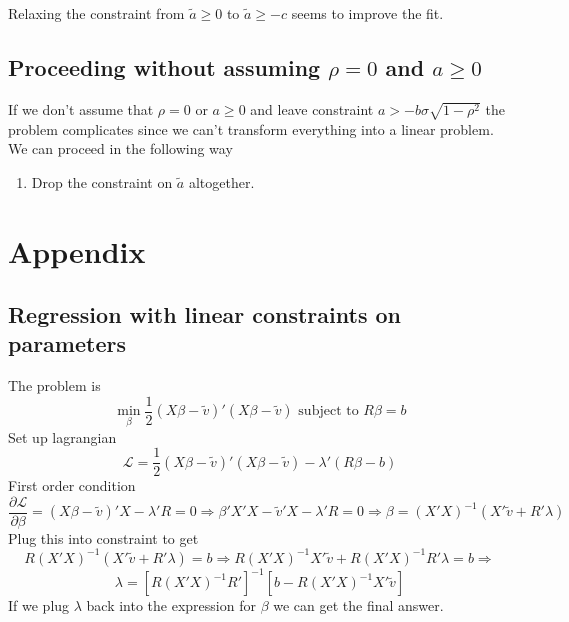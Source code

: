 \documentclass[12pt]{article}
\newcommand{\parder}[2]{\frac{\partial #1}{\partial #2}}
\begin{document}
Relaxing the constraint from $\tilde{a} \ge 0$ to $\tilde{a} \ge -c$ seems to improve the fit.

\subsection{Proceeding without assuming $\rho = 0$ and $a \ge 0$}

If we don't assume that $\rho = 0$ or $a \ge 0$ and leave constraint $a > -b\sigma\sqrt{1-\rho^2}$ the problem complicates since we can't transform everything into a linear problem. We can proceed in the following way

\begin{enumerate}
	\item Drop the constraint on $\tilde{a}$ altogether.
\end{enumerate}



\section{Appendix}

\subsection{Regression with linear constraints on parameters}

The problem is 
\[\min_{\beta} \frac{1}{2}(X\beta - \tilde{v})'(X\beta - \tilde{v}) \text{ subject to } R\beta = b\]
Set up lagrangian
\[\mathcal{L} = \frac{1}{2}(X\beta - \tilde{v})'(X\beta - \tilde{v}) - \lambda' (R\beta - b)\]
First order condition
\[\parder{\mathcal{L}}{\beta} = (X\beta - \tilde{v})'X - \lambda' R = 0 \Rightarrow \beta'X'X - \tilde{v}'X - \lambda'R = 0 \Rightarrow \beta = (X'X)^{-1}(X'\tilde{v} + R'\lambda)\]
Plug this into constraint to get
\[R(X'X)^{-1}(X'\tilde{v} + R'\lambda) = b \Rightarrow R(X'X)^{-1}X'\tilde{v} + R(X'X)^{-1}R'\lambda = b \Rightarrow\] 
\[\lambda = \left[R(X'X)^{-1}R'\right]^{-1}\left[b - R(X'X)^{-1}X'\tilde{v}\right]\]
If we plug $\lambda$ back into the expression for $\beta$ we can get the final answer.


	
\end{document}
